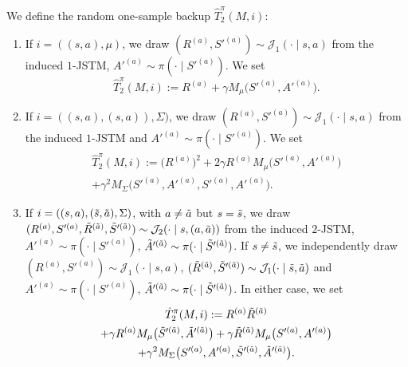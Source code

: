 \documentclass[accepted]{uai2026}
\theoremstyle{plain}
\theoremstyle{definition}
\theoremstyle{remark}
\newcommand{\1}{\mathbbm{1}}
\begin{document}
We define the random one-sample backup $\hat{T}^\pi_2(M,i)$:
\begin{enumerate}[leftmargin=*, itemsep=0pt, align=left]
\item[(i)] If $i = ((s, a), \mu)$, we draw $(R^{(a)}, S'^{(a)}) \sim \mathcal{J}_1(\cdot \mid s, a)$ from the induced $1$-JSTM, $A'^{(a)} \sim \pi(\cdot \mid S'^{(a)})$. We set
\begin{equation}
\hat{T}^\pi_2 (M, i) := R^{(a)} + \gamma M_\mu\big(S'^{(a)}, A'^{(a)}\big).
\end{equation}
\item[(ii)] If $i = ((s, a),(s,a)), \Sigma)$, we draw $(R^{(a)}, S'^{(a)}) \sim \mathcal{J}_1(\cdot \mid s, a)$ from the induced $1$-JSTM and $
A'^{(a)} \sim \pi (\cdot \mid S'^{(a)})$. We set
\begin{equation}
\begin{gathered}
\hat{T}^\pi_2 (M, i) :=\big( R^{(a)}\big)^2+2\gamma R^{(a)}M_\mu\big(S'^{(a)}, A'^{(a)}\big) \\+ \gamma^2 M_\Sigma\big(S'^{(a)}, A'^{(a)}, S'^{(a)}, A'^{(a)}\big).
\end{gathered}
\end{equation}
\item[(iii)] If $i = ((s,a), (\Tilde{s}, \Tilde{a}), \Sigma)$, with $a \ne \Tilde{a}$ but $s= \Tilde{s}$, we draw $(R^{(a)}, S'^{(a)}, \Tilde{R}^{(\Tilde{a})}, \Tilde{S}'^{(\Tilde{a})}) \sim \mathcal{J}_2(\cdot \mid s, (a, \Tilde{a}))$ from the induced $2$-JSTM, $A'^{(a)} \sim \pi (\cdot \mid S'^{(a)})$, $  \Tilde{A}'^{(\Tilde{a})} \sim \pi(\cdot \mid \Tilde{S}'^{(\Tilde{a})})$. If $s \ne \Tilde{s}$, we independently draw $(R^{(a)}, S'^{(a)}) \sim \mathcal{J}_1(\cdot \mid s, a)$, $(\Tilde{R}^{(\Tilde{a})}, \Tilde{S}'^{(\Tilde{a})}) \sim \mathcal{J}_1(\cdot \mid \Tilde{s}, \Tilde{a})$ and $
A'^{(a)} \sim \pi (\cdot \mid S'^{(a)})$, $\Tilde{A}'^{(\Tilde{a})} \sim \pi(\cdot \mid \Tilde{S}'^{(\Tilde{a})})$. In either case, we set
\begin{equation}
\begin{gathered}
\hat{T}^\pi_2(M, i):=R^{(a)}\Tilde{R}^{(\Tilde{a})}\\+\gamma R^{(a)} M_\mu\big(\Tilde{S}'^{(\Tilde{a})},\Tilde{A}'^{(\Tilde{a})}\big)+  \gamma \Tilde{R}^{(\Tilde{a})} M_\mu\big(S'^{(a)},A'^{(a)}\big) \\+ \gamma^2 M_\Sigma\big(S'^{(a)}, A'^{(a)}, \Tilde{S}'^{(\Tilde{a})}, \Tilde{A}'^{(\Tilde{a})}\big).
\end{gathered}
\end{equation}
\end{enumerate}
\end{document}
